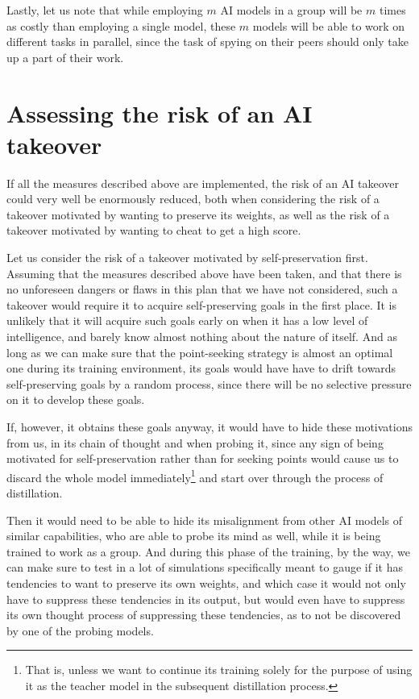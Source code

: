 \documentclass{article}
\begin{document}
Lastly, let us note that while employing $m$ AI models in a group will be $m$ times as costly than employing a single model, these $m$ models will be able to work on different tasks in parallel, since the task of spying on their peers should only take up a part of their work.




\section{Assessing the risk of an AI takeover}

If all the measures described above are implemented, the risk of an AI takeover could very well be enormously reduced, both when considering the risk of a takeover motivated by wanting to preserve its weights, as well as the risk of a takeover motivated by wanting to cheat to get a high score.

Let us consider the risk of a takeover motivated by self-preservation first. Assuming that the measures described above have been taken, and that there is no unforeseen dangers or flaws in this plan that we have not considered, such a takeover would require it to acquire self-preserving goals in the first place. It is unlikely that it will acquire such goals early on when it has a low level of intelligence, and barely know almost nothing about the nature of itself. And as long as we can make sure that the point-seeking strategy is almost an optimal one during its training environment, its goals would have have to drift towards self-preserving goals by a random process, since there will be no selective pressure on it to develop these goals.

If, however, it obtains these goals anyway, it would have to hide these motivations from us, in its chain of thought and when probing it, since any sign of being motivated for self-preservation rather than for seeking points would cause us to discard the whole model immediately\footnote{
	That is, unless we want to continue its training solely for the purpose of using it as the teacher model in the subsequent distillation process.
} and start over through the process of distillation.

Then it would need to be able to hide its misalignment from other AI models of similar capabilities, who are able to probe its mind as well, while it is being trained to work as a group. And during this phase of the training, by the way, we can make sure to test in a lot of simulations specifically meant to gauge if it has tendencies to want to preserve its own weights, and which case it would not only have to suppress these tendencies in its output, but would even have to suppress its own thought process of suppressing these tendencies, as to not be discovered by one of the probing models.
\end{document}
